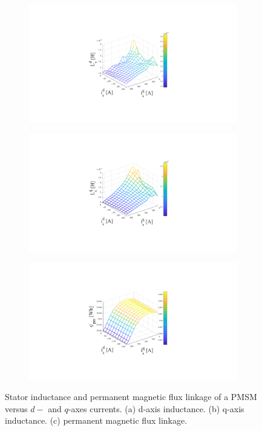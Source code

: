 \begin{figure}[t]
    \centering
    \begin{subfigure}[b]{0.30\textwidth}
        \centering
        \includegraphics[scale=0.4]{chapters/Fig2.4a.pdf}
        \caption{}
        \label{Fig:2.4a}
    \end{subfigure}
    \hfill
    \begin{subfigure}[b]{0.30\textwidth}
        \centering
        \includegraphics[scale=0.4]{chapters/Fig2.4b.pdf}
        \caption{}
        \label{Fig:2.4b}
    \end{subfigure}
    \hfill
    \begin{subfigure}[b]{0.30\textwidth}
        \centering
        \includegraphics[scale=0.4]{chapters/Fig2.4c.pdf}
        \caption{}
        \label{Fig:2.4c}
    \end{subfigure}
    \caption{Stator inductance and permanent magnetic flux linkage of a PMSM versus $d-$ and $q$-axes currents. (a) d-axis inductance. (b) q-axis inductance. (c) permanent magnetic flux linkage.}
    \label{Fig:2.4}
\end{figure}

